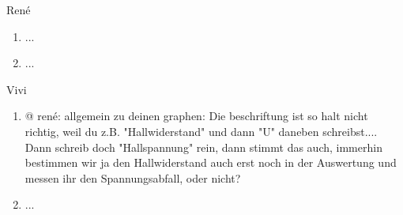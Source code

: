 
René
\begin{enumerate}
	\item ...
	\item ...
\end{enumerate}

Vivi
\begin{enumerate}
	\item @ rené: allgemein zu deinen graphen: Die beschriftung ist so halt nicht richtig, weil du z.B. "Hallwiderstand" und dann "U" daneben schreibst.... Dann schreib doch "Hallspannung" rein, dann stimmt das auch, immerhin bestimmen wir ja den Hallwiderstand auch erst noch in der Auswertung und messen ihr den Spannungsabfall, oder nicht? 
	\item ...
\end{enumerate}